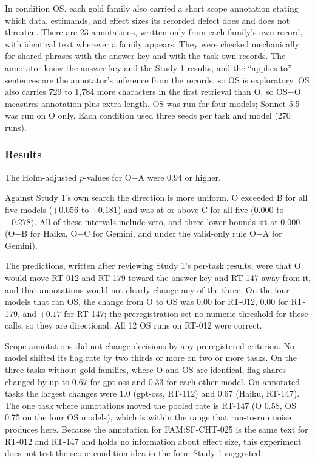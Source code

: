 \documentclass[11pt]{article}
\begin{document}
In condition OS, each gold family also carried a short scope annotation stating which data, estimands, and effect sizes its recorded defect does and does not threaten. There are 23 annotations, written only from each family's own record, with identical text wherever a family appears. They were checked mechanically for shared phrases with the answer key and with the task-own records. The annotator knew the answer key and the Study 1 results, and the ``applies to'' sentences are the annotator's inference from the records, so OS is exploratory. OS also carries 729 to 1,784 more characters in the first retrieval than O, so OS$-$O measures annotation plus extra length. OS was run for four models; Sonnet 5.5 was run on O only. Each condition used three seeds per task and model (270 runs).

\subsubsection{Results}

The Holm-adjusted $p$-values for O$-$A were 0.94 or higher.

Against Study 1's own search the direction is more uniform. O exceeded B for all five models ($+0.056$ to $+0.181$) and was at or above C for all five ($0.000$ to $+0.278$). All of these intervals include zero, and three lower bounds sit at $0.000$ (O$-$B for Haiku, O$-$C for Gemini, and under the valid-only rule O$-$A for Gemini).

The predictions, written after reviewing Study 1's per-task results, were that O would move RT-012 and RT-179 toward the answer key and RT-147 away from it, and that annotations would not clearly change any of the three. On the four models that ran OS, the change from O to OS was $0.00$ for RT-012, $0.00$ for RT-179, and $+0.17$ for RT-147; the preregistration set no numeric threshold for these calls, so they are directional. All 12 OS runs on RT-012 were correct.

Scope annotations did not change decisions by any preregistered criterion. No model shifted its flag rate by two thirds or more on two or more tasks. On the three tasks without gold families, where O and OS are identical, flag shares changed by up to 0.67 for gpt-oss and 0.33 for each other model. On annotated tasks the largest changes were 1.0 (gpt-oss, RT-112) and 0.67 (Haiku, RT-147). The one task where annotations moved the pooled rate is RT-147 (O 0.58, OS 0.75 on the four OS models), which is within the range that run-to-run noise produces here. Because the annotation for FAM:SF-CHT-025 is the same text for RT-012 and RT-147 and holds no information about effect size, this experiment does not test the scope-condition idea in the form Study 1 suggested.
\end{document}
